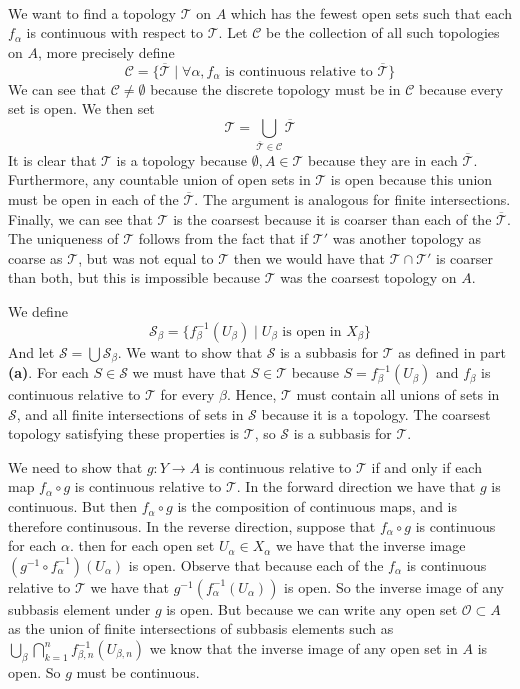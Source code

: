\documentclass{article}
\DeclareMathOperator{\suchthat}{\mathrel{|}}
\DeclareMathOperator{\of}{\mathrel{\circ}}
\newcommand{\problem}[1]{\noindent{\textbf{Problem #1}}\\}
\newcommand{\problempart}[1]{\noindent{\textbf{(#1)}}}
\begin{document}
\problem{2.19.10}
\problempart{a} We want to find a topology $\mathcal{T}$ on $A$ which has the fewest open sets such that each $f_\alpha$ is continuous with respect to $\mathcal{T}$. Let $\mathcal{C}$ be the collection of all such topologies on $A$, more precisely define
\[
\mathcal{C} = \{\overline{\mathcal{T}} \suchthat \forall \alpha, f_\alpha \text{ is continuous relative to } \overline{\mathcal{T}}\}
\]
We can see that $\mathcal{C} \neq \emptyset$ because the discrete topology must be in $\mathcal{C}$ because every set is open. We then set 
\[
\mathcal{T} = \bigcup_{\overline{\mathcal{T}} \in \mathcal{C}} \overline{\mathcal{T}}
\]
It is clear that $\mathcal{T}$ is a topology because $\emptyset, A \in \mathcal{T}$ because they are in each $\overline{\mathcal{T}}$. Furthermore, any countable union of open sets in $\mathcal{T}$ is open because this union must be open in each of the $\overline{\mathcal{T}}$. The argument is analogous for finite intersections. Finally, we can see that $\mathcal{T}$ is the coarsest because it is coarser than each of the $\overline{\mathcal{T}}$. The uniqueness of $\mathcal{T}$ follows from the fact that if $\mathcal{T}'$ was another topology as coarse as $\mathcal{T}$, but was not equal to $\mathcal{T}$ then we would have that $\mathcal{T} \cap \mathcal{T}'$ is coarser than both, but this is impossible because $\mathcal{T}$ was the coarsest topology on $A$. 

\problempart{b} We define 
\[
\mathcal{S}_\beta = \{f^{-1}_\beta(U_\beta) \suchthat U_\beta \text{ is open in } X_\beta\}
\]
And let $\mathcal{S} = \bigcup \mathcal{S}_\beta$. We want to show that $\mathcal{S}$ is a subbasis for $\mathcal{T}$ as defined in part {\bf (a)}. For each $S \in \mathcal{S}$ we must have that $S \in \mathcal{T}$ because $S = f^{-1}_\beta(U_\beta)$ and $f_\beta$ is continuous relative to $\mathcal{T}$ for every $\beta$. Hence, $\mathcal{T}$ must contain all unions of sets in $\mathcal{S}$, and all finite intersections of sets in $\mathcal{S}$ because it is a topology. The coarsest topology satisfying these properties is $\mathcal{T}$, so $\mathcal{S}$ is a subbasis for $\mathcal{T}$.

\problempart{c} We need to show that $g: Y \to A$ is continuous relative to $\mathcal{T}$ if and only if each map $f_\alpha \of g$ is continuous relative to $\mathcal{T}$. In the forward direction we have that $g$ is continuous. But then $f_\alpha \of g$ is the composition of continuous maps, and is therefore continusous. In the reverse direction, suppose that $f_\alpha \of g$ is continuous for each $\alpha$. then for each open set $U_\alpha \in X_\alpha$ we have that the inverse image $(g^{-1} \of f_\alpha^{-1})(U_\alpha)$ is open. Observe that because each of the $f_\alpha$ is continuous relative to $\mathcal{T}$ we have that $g^{-1}(f_\alpha^{-1}(U_\alpha))$ is open. So the inverse image of any subbasis element under $g$ is open. But because we can write any open set $\mathcal{O} \subset A$ as the union of finite intersections of subbasis elements such as $\bigcup_\beta \bigcap_{k=1}^n f^{-1}_{\beta,n} (U_{\beta,n})$ we know that the inverse image of any open set in $A$ is open. So $g$ must be continuous. 
\end{document}
